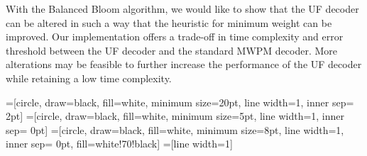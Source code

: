 \documentclass[10pt, a4paper, twoside, titlepage, usenames,dvipsnames]{report}
\begin{document}
With the Balanced Bloom algorithm, we would like to show that the UF decoder can be altered in such a way that the heuristic for minimum weight can be improved. Our implementation offers a trade-off in time complexity and error threshold between the UF decoder and the standard MWPM decoder. More alterations may be feasible to further increase the performance of the UF decoder while retaining a low time complexity.

\vspace{2em}
\printbibliography[heading=none]

=[circle, draw=black, fill=white, minimum size=20pt, line width=1, inner sep= 2pt]
=[circle, draw=black, fill=white, minimum size=5pt, line width=1, inner sep= 0pt]
=[circle, draw=black, fill=white, minimum size=8pt, line width=1, inner sep= 0pt, fill=white!70!black]
=[line width=1]
\tikzfading[name=fade right, left color=transparent!0, right color=transparent!100]
\end{document}
